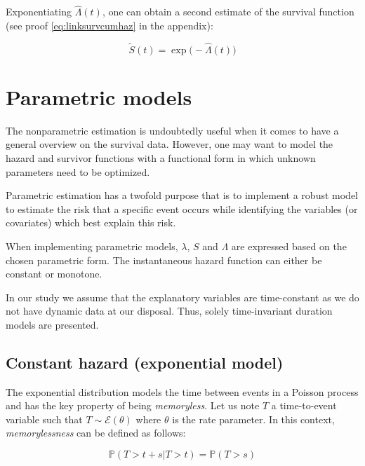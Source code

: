 \documentclass[
]{book}
\begin{document}
Exponentiating \(\hat{\Lambda}(t)\), one can obtain a second estimate of the survival function (see proof \eqref{eq:linksurvcumhaz} in the appendix):

\begin{equation}
    \tilde{S}(t) = \exp \big( -\hat{\Lambda}(t) \big)
    \label{eq:survest}
\end{equation}

\hypertarget{parametric}{%
\section{Parametric models}\label{parametric}}

The nonparametric estimation is undoubtedly useful when it comes to have a general overview on the survival data. However, one may want to model the hazard and survivor functions with a functional form in which unknown parameters need to be optimized.

Parametric estimation has a twofold purpose that is to implement a robust model to estimate the risk that a specific event occurs while identifying the variables (or covariates) which best explain this risk.

When implementing parametric models, \(\lambda\), \(S\) and \(\Lambda\) are expressed based on the chosen parametric form. The instantaneous hazard function can either be constant or monotone.

In our study we assume that the explanatory variables are time-constant as we do not have dynamic data at our disposal. Thus, solely time-invariant duration models are presented.

\hypertarget{constant-hazard-exponential-model}{%
\subsection{Constant hazard (exponential model)}\label{constant-hazard-exponential-model}}

The exponential distribution models the time between events in a Poisson process and has the key property of being \emph{memoryless}. Let us note \(T\) a time-to-event variable such that \(T \sim \mathcal{E}(\theta)\) where \(\theta\) is the rate parameter. In this context, \emph{memorylessness} can be defined as follows:

\begin{equation}
  \mathbb{P}(T>t+s | T > t) = \mathbb{P}(T>s)
  \label{eq:memorylessness}
\end{equation}
\end{document}

